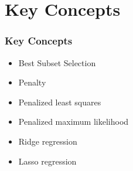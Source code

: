 \documentclass[mathserif, xcolor=table, svgnames]{beamer}
\begin{document}
\section{Key Concepts}
\frame{\tableofcontents[currentsubsection]}

\begin{frame}
  \frametitle{Key Concepts}
  \begin{itemize}
  \item Best Subset Selection
  \item Penalty
  \item Penalized least squares
  \item Penalized maximum likelihood
  \item Ridge regression
  \item Lasso regression
  \end{itemize}
\end{frame}
\end{document}
